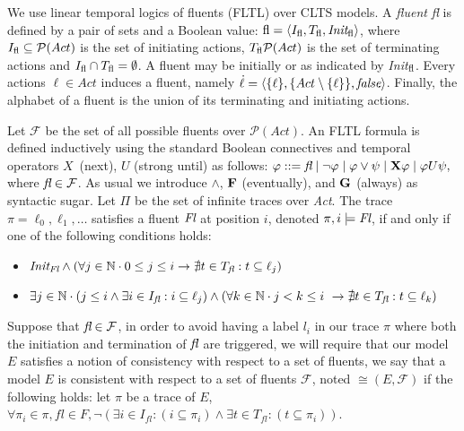 
We use linear temporal logics of fluents (FLTL) over CLTS models. %
A \emph{fluent} \emph{fl} is defined by a pair of sets and a Boolean value: $\emph{\emph{fl}} = \langle I_{\emph{\emph{fl}}}, T_{\emph{\emph{fl}}}, \emph{Init}_{\emph{\emph{fl}}} \rangle$, where $I_{\emph{\emph{fl}}}\subseteq \mathcal{P}(Act)$ is the set of initiating actions, $T_{\emph{\emph{fl}}} \mathcal{P}(Act)$ is the set of terminating actions and $I_{\emph{\emph{fl}}}\cap T_{\emph{\emph{fl}}}=\emptyset$. 
A fluent may be initially \true or \false as indicated by \emph{Init}$_{\emph{\emph{fl}}}$. 
Every actions $\ell\in Act$ induces a fluent, namely $\dot{\ell}=\langle \{\ell\}, \{Act\setminus \{\ell\}\}, \emph{false}\rangle$. 
Finally, the alphabet of a fluent is the union of its terminating and initiating actions.

Let $\mathcal{F}$ be the set of all possible fluents over $\mathcal{P}(Act)$. 
An FLTL formula is defined inductively using the standard Boolean connectives and temporal operators $X$~(next), $U$ (strong until) as follows: 
$\varphi ::= \emph{fl} \mid \neg \varphi \mid \varphi \vee \psi \mid {\bf X} \varphi \mid \varphi U \psi,$
where $\emph{fl}\in\mathcal{F}$. 
As usual we introduce $\wedge$, ${\bf F}$ (eventually), and ${\bf G}$ (always) as syntactic sugar. 
Let $\Pi$ be the set of infinite traces over \emph{Act}.
The trace $\pi=\ell_0,\ell_1,\ldots$ satisfies a fluent $\emph{Fl}$ at position $i$, denoted $\pi,i \models \emph{Fl}$, if and only if one of the following conditions holds:
\begin{itemize}%
	\item $\emph{Init}_{\emph{Fl}} \wedge (\forall j \in \mathbb{N} \cdot 0 \leq j \leq i \rightarrow \nexists t \in T_{\emph{fl}}: t \subseteq \ell_j)$
	\item $\exists j \in \mathbb{N} \cdot (j \leq i \wedge \exists i \in I_{\emph{fl}}: i \subseteq \ell_j) \wedge (\forall k \in \mathbb{N} \cdot j < k \leq i \ \rightarrow \nexists t \in T_{\emph{fl}}: t \subseteq \ell_k)$
\end{itemize}

Suppose that $\emph{fl} \in \mathcal{F}$, in order to avoid having a label $l_i$ in our trace $\pi$ where both the initiation and termination of $\emph{fl}$ are triggered, we will require that our model $E$ satisfies a notion of consistency with respect to a set of fluents, we say that a model $E$ is consistent with respect to a set of fluents $\mathcal{F}$, noted $\cong(E,\mathcal{F})$ if the following holds: let $\pi$ be a trace of $E$,
$\forall \pi_i \in \pi, fl \in F, \neg(\exists i \in I_{fl}: (i \subseteq \pi_i) \wedge \exists t \in T_{fl}: (t \subseteq \pi_i))$.


